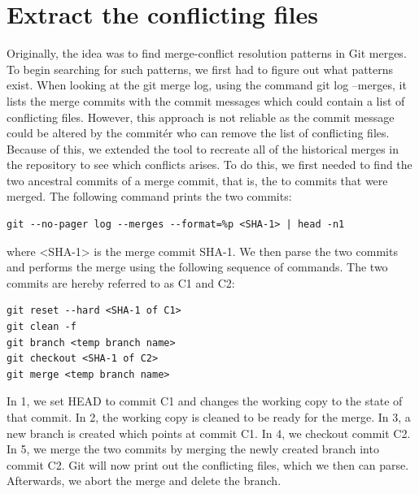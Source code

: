 \section{Extract the conflicting files}
Originally, the idea was to find merge-conflict resolution patterns in Git merges. To begin searching for such patterns, we first had to figure out what patterns exist. When looking at the git merge log, using the command git log --merges, it lists the merge commits with the commit messages which could contain a list of conflicting files. However, this approach is not reliable as the commit message could be altered by the commitér who can remove the list of conflicting files. Because of this, we extended the tool to recreate all of the historical merges in the repository to see which conflicts arises. To do this, we first needed to find the two ancestral commits of a merge commit, that is, the to commits that were merged. The following command prints the two commits:
\lstset{language=Bash}
\begin{lstlisting}[frame=single]
git --no-pager log --merges --format=%p <SHA-1> | head -n1
\end{lstlisting}
where <SHA-1> is the merge commit SHA-1. We then parse the two commits and performs the merge using the following sequence of commands. The two commits are hereby referred to as C1 and C2:\\
\lstset{language=Bash}
\begin{lstlisting}[frame=single]
git reset --hard <SHA-1 of C1>
git clean -f
git branch <temp branch name>
git checkout <SHA-1 of C2>
git merge <temp branch name>
\end{lstlisting}
In 1, we set HEAD to commit C1 and changes the working copy to the state of that commit. In 2,  the working copy is cleaned to be ready for the merge. In 3, a new branch is created which points at commit C1. In 4, we checkout commit C2. In 5, we merge the two commits by merging the newly created branch into commit C2. Git will now print out the conflicting files, which we then can parse. Afterwards, we abort the merge and delete the branch.
